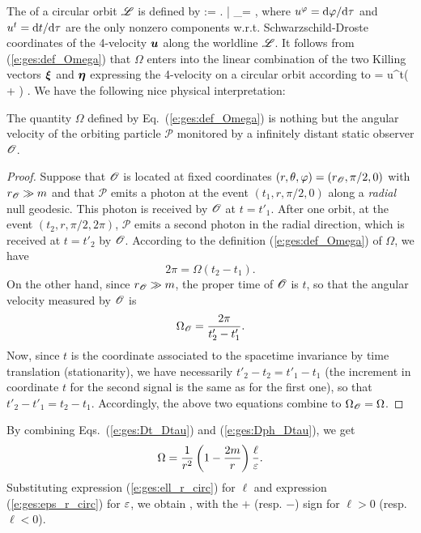 The  of a circular orbit $\mathscr{L}$ is defined by
\be \label{e:ges:def_Omega}
    \Omega := \left.  \right| _\Li =  ,
\ee
where $u^\varphi = \mathrm{d}\varphi/\mathrm{d}\tau$ and $u^t = \mathrm{d} t/\mathrm{d}\tau$ are the only
nonzero components w.r.t. Schwarzschild-Droste coordinates
of the 4-velocity $\bm{u}$ along the worldline
$\mathscr{L}$. It follows from (\ref{e:ges:def_Omega}) that
$\Omega$ enters into the linear combination of the two Killing
vectors $\bm{\xi}$ and $\bm{\eta}$ expressing the 4-velocity on a circular
orbit according to
\be
     = u^t\left( \w{\xi} + \Omega \w{\eta} \right) .
\ee
We have the following nice physical interpretation:
\begin{prop}
The quantity $\Omega$ defined by Eq.~(\ref{e:ges:def_Omega}) is nothing but
the angular velocity of the orbiting particle $\mathscr{P}$ monitored by a infinitely
distant static observer $\mathscr{O}$.
\end{prop}
\begin{proof}
Suppose that $\mathscr{O}$ is located at fixed coordinates
$(r,\theta,\varphi)=(r_{\mathscr{O}},\pi/2,0)$ with $r_{\mathscr{O}}\gg m$ and that
$\mathscr{P}$ emits a photon at the event
$(t_1, r, \pi/2, 0)$ along a \emph{radial} null geodesic. This photon is received
by $\mathscr{O}$ at $t=t'_1$. After one orbit, at the event $(t_2, r, \pi/2, 2\pi)$,
$\mathscr{P}$ emits a second photon in the radial direction, which is received
at $t=t'_2$ by $\mathscr{O}$. According to the definition (\ref{e:ges:def_Omega})
of $\Omega$, we have
\[
    2\pi = \Omega(t_2 - t_1) .
\]
On the other hand, since $r_{\mathscr{O}}\gg m$, the proper time of $\mathscr{O}$ is $t$, so that the
angular velocity measured by $\mathscr{O}$ is
\[
    \Omega_{\mathscr{O}} = \frac{2\pi}{t'_2 - t'_1} .
\]
Now, since $t$ is the coordinate associated to
the spacetime invariance by time translation (stationarity), we have
necessarily $t'_2 - t_2 = t'_1 - t_1$
(the increment in coordinate $t$ for the second signal is the same as for the first one),
so that $t'_2 - t'_1 = t_2 - t_1$. Accordingly, the above two equations
combine to $\Omega_{\mathscr{O}} = \Omega$.
\end{proof}

By combining Eqs.~(\ref{e:ges:Dt_Dtau}) and (\ref{e:ges:Dph_Dtau}), we get
\[
    \Omega = \frac{1}{r^2} \left( 1 -\frac{2m}{r} \right) \frac{\ell}{\varepsilon} .
\]
Substituting expression (\ref{e:ges:ell_r_circ}) for $\ell$ and
expression (\ref{e:ges:eps_r_circ}) for $\varepsilon$, we obtain
\be \label{e:ges:Omega_m_r}
     ,
\ee
with the $+$  (resp. $-$) sign for $\ell > 0$ (resp. $\ell < 0$).

